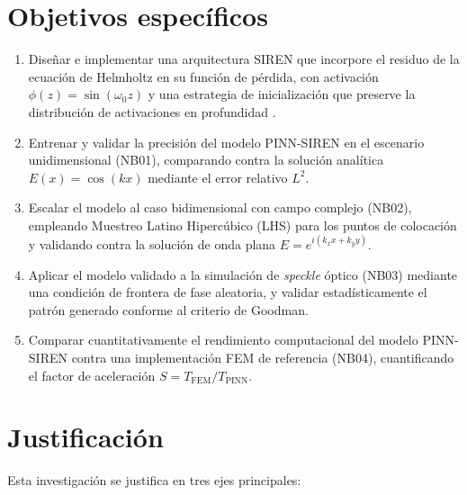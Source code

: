 \section{Objetivos específicos}

\begin{enumerate}
    \item Diseñar e implementar una arquitectura SIREN que incorpore el residuo
    de la ecuación de Helmholtz en su función de pérdida, con activación
    $\phi(z) = \sin(\omega_0 z)$ y una estrategia de inicialización que preserve
    la distribución de activaciones en profundidad \parencite{sitzmann2020siren}.

    \item Entrenar y validar la precisión del modelo PINN-SIREN en el escenario
    unidimensional (NB01), comparando contra la solución analítica
    $E(x) = \cos(kx)$ mediante el error relativo $L^2$.

    \item Escalar el modelo al caso bidimensional con campo complejo (NB02),
    empleando Muestreo Latino Hipercúbico (LHS) para los puntos de colocación y
    validando contra la solución de onda plana $E = e^{i(k_x x + k_y y)}$.

    \item Aplicar el modelo validado a la simulación de \textit{speckle} óptico
    (NB03) mediante una condición de frontera de fase aleatoria, y validar
    estadísticamente el patrón generado conforme al criterio de Goodman.

    \item Comparar cuantitativamente el rendimiento computacional del modelo
    PINN-SIREN contra una implementación FEM de referencia (NB04), cuantificando
    el factor de aceleración $S = T_\text{FEM} / T_\text{PINN}$.
\end{enumerate}

\section{Justificación}

Esta investigación se justifica en tres ejes principales:

